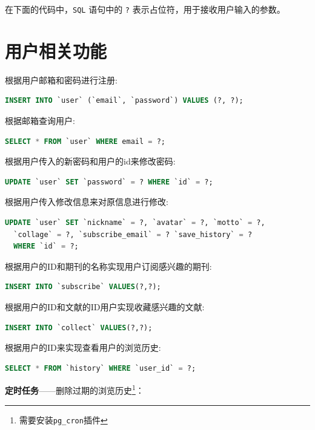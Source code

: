 \documentclass[UTF8,openany]{ctexbook}
\begin{document}
在下面的代码中，\texttt{SQL} 语句中的 \texttt{?} 表示占位符，用于接收用户输入的参数。

\section{用户相关功能}

根据用户邮箱和密码进行注册:

\begin{lstlisting}[language=SQL]
INSERT INTO `user` (`email`, `password`) VALUES (?, ?);
\end{lstlisting}

根据邮箱查询用户:

\begin{lstlisting}[language=SQL]
SELECT * FROM `user` WHERE email = ?;
\end{lstlisting}

根据用户传入的新密码和用户的id来修改密码:

\begin{lstlisting}[language=SQL]
UPDATE `user` SET `password` = ? WHERE `id` = ?;
\end{lstlisting}

根据用户传入修改信息来对原信息进行修改:

\begin{lstlisting}[language=SQL]
UPDATE `user` SET `nickname` = ?, `avatar` = ?, `motto` = ?, 
  `collage` = ?, `subscribe_email` = ? `save_history` = ? 
  WHERE `id` = ?;
\end{lstlisting}

根据用户的ID和期刊的名称实现用户订阅感兴趣的期刊:

\begin{lstlisting}[language=SQL]
INSERT INTO `subscribe` VALUES(?,?);
\end{lstlisting}

根据用户的ID和文献的ID用户实现收藏感兴趣的文献:

\begin{lstlisting}[language=SQL]
INSERT INTO `collect` VALUES(?,?); 
\end{lstlisting}

根据用户的ID来实现查看用户的浏览历史:

\begin{lstlisting}[language=SQL]
SELECT * FROM `history` WHERE `user_id` = ?;
\end{lstlisting}

\textbf{定时任务}——删除过期的浏览历史\footnote{需要安装\texttt{pg\_cron}插件}：
\end{document}

